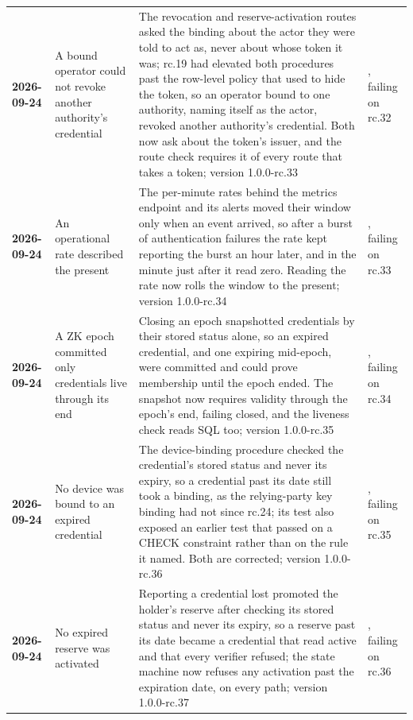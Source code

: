 {\begin{xltabular}{\textwidth}{>{\bfseries\hspace{0pt}}p{0.62in} >{\RaggedRight\arraybackslash\hspace{0pt}}X >{\RaggedRight\arraybackslash\hspace{0pt}}X >{\RaggedRight\arraybackslash\hspace{0pt}}p{1.6in}}
2026-09-24 & A bound operator could not revoke another authority's credential & The revocation and reserve-activation routes asked the binding about the actor they were told to act as, never about whose token it was; rc.19 had elevated both procedures past the row-level policy that used to hide the token, so an operator bound to one authority, naming itself as the actor, revoked another authority's credential. Both now ask about the token's issuer, and the route check requires it of every route that takes a token; version 1.0.0-rc.33 & , failing on rc.32 \\
2026-09-24 & An operational rate described the present & The per-minute rates behind the metrics endpoint and its alerts moved their window only when an event arrived, so after a burst of authentication failures the rate kept reporting the burst an hour later, and in the minute just after it read zero. Reading the rate now rolls the window to the present; version 1.0.0-rc.34 & , failing on rc.33 \\
2026-09-24 & A ZK epoch committed only credentials live through its end & Closing an epoch snapshotted credentials by their stored status alone, so an expired credential, and one expiring mid-epoch, were committed and could prove membership until the epoch ended. The snapshot now requires validity through the epoch's end, failing closed, and the liveness check reads SQL too; version 1.0.0-rc.35 & , failing on rc.34 \\
2026-09-24 & No device was bound to an expired credential & The device-binding procedure checked the credential's stored status and never its expiry, so a credential past its date still took a binding, as the relying-party key binding had not since rc.24; its test also exposed an earlier test that passed on a CHECK constraint rather than on the rule it named. Both are corrected; version 1.0.0-rc.36 & , failing on rc.35 \\
2026-09-24 & No expired reserve was activated & Reporting a credential lost promoted the holder's reserve after checking its stored status and never its expiry, so a reserve past its date became a credential that read active and that every verifier refused; the state machine now refuses any activation past the expiration date, on every path; version 1.0.0-rc.37 & , failing on rc.36 \\

\end{xltabular}}
